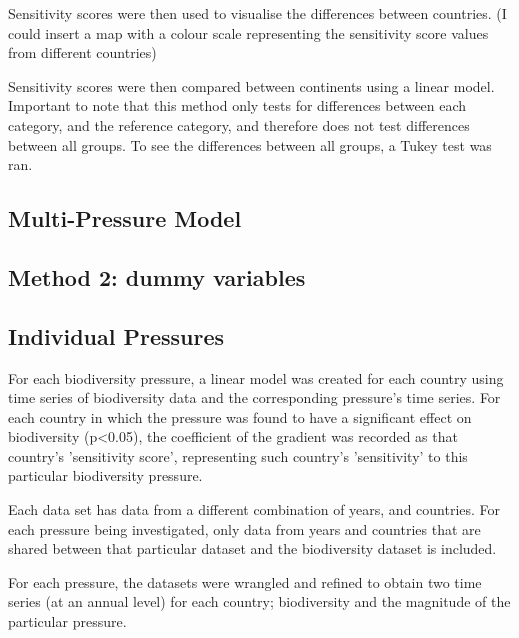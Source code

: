 \documentclass[11pt, a4paper, titlepage]{article}
\begin{document}
	Sensitivity scores were then used to visualise the differences between countries. (I could insert a map with a colour scale representing the sensitivity score values from different countries) \newline
	
	Sensitivity scores were then compared between continents using a linear model. Important to note that this method only tests for differences between each category, and the reference category, and therefore does not test differences between all groups. To see the differences between all groups, a Tukey test was ran.  \newline
	
	
	\subsection*{Multi-Pressure Model}
	
	\subsection*{Method 2: dummy variables}
	
	\subsection*{Individual Pressures}
	For each biodiversity pressure, a linear model was created for each country using time series of biodiversity data and the corresponding pressure's time series. For each country in which the pressure was found to have a significant effect on biodiversity (p<0.05), the coefficient of the gradient was recorded as that country's 'sensitivity score', representing such country's 'sensitivity' to this particular biodiversity pressure. \newline

Each data set has data from a different combination of years, and countries. For each pressure being investigated, only data from years and countries that are shared between that particular dataset and the biodiversity dataset is included. \newline

For each pressure, the datasets were wrangled and refined to obtain two time series (at an annual level) for each country; biodiversity and the magnitude of the particular pressure. 
\end{document}

